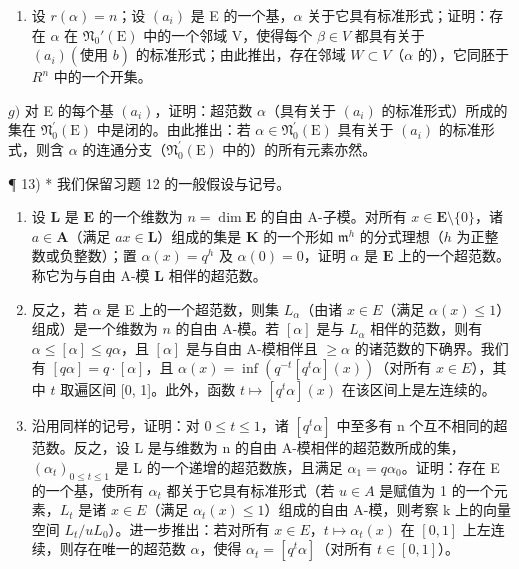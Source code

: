 \begin{enumerate}
\def\labelenumi{\alph{enumi})}
\setcounter{enumi}{5}
\tightlist
\item
  设 \(r(\alpha) = n\)；设 \((a_i)\) 是 E 的一个基，\(\alpha\) 关于它具有标准形式；证明：存在 \(\alpha\) 在 \(\mathfrak{N}_0'(\mathrm{E})\) 中的一个邻域 V，使得每个 \(\beta \in V\) 都具有关于 \((a_i)(\text{使用 } b)\) 的标准形式；由此推出，存在邻域 \(W \subset V\)（\(\alpha\) 的），它同胚于 \(R^n\) 中的一个开集。
\end{enumerate}

\(g)\) 对 E 的每个基 \((a_i)\)，证明：超范数 \(\alpha\)（具有关于 \((a_i)\) 的标准形式）所成的集在 \(\mathfrak{N}_0^{\prime}(\mathrm{E})\) 中是闭的。由此推出：若 \(\alpha \in \mathfrak{N}_0^{\prime}(\mathrm{E})\) 具有关于 \((a_i)\) 的标准形式，则含 \(\alpha\) 的连通分支（\(\mathfrak{N}_0^{\prime}(\mathrm{E})\) 中的）的所有元素亦然。

¶ 13) * 我们保留习题 12 的一般假设与记号。

\begin{enumerate}
\def\labelenumi{\alph{enumi})}
\item
  设 \(\mathbf{L}\) 是 \(\mathbf{E}\) 的一个维数为 \(n = \dim \mathbf{E}\) 的自由 A-子模。对所有 \(x \in \mathbf{E} \setminus \{0\}\)，诸 \(a \in \mathbf{A}\)（满足 \(ax \in \mathbf{L}\)）组成的集是 \(\mathbf{K}\) 的一个形如 \(\mathfrak{m}^h\) 的分式理想（\(h\) 为正整数或负整数）；置 \(\alpha(x) = q^h\) 及 \(\alpha(0) = 0\)，证明 \(\alpha\) 是 \(\mathbf{E}\) 上的一个超范数。称它为与自由 A-模 \(\mathbf{L}\) 相伴的超范数。
\item
  反之，若 \(\alpha\) 是 E 上的一个超范数，则集 \(L_{\alpha}\)（由诸 \(x \in E\)（满足 \(\alpha(x) \leqslant 1\)）组成）是一个维数为 \(n\) 的自由 A-模。若 \([\alpha]\) 是与 \(L_{\alpha}\) 相伴的范数，则有 \(\alpha \leqslant [\alpha] \leqslant q\alpha\)，且 \([\alpha]\) 是与自由 A-模相伴且 \(\geqslant \alpha\) 的诸范数的下确界。我们有 \([q\alpha] = q \cdot [\alpha]\)，且 \(\alpha(x) = \inf(q^{-t}[q^t\alpha](x))\)（对所有 \(x \in E\)），其中 \(t\) 取遍区间 {[}0, 1{]}。此外，函数 \(t \mapsto [q^t\alpha](x)\) 在该区间上是左连续的。
\item
  沿用同样的记号，证明：对 \(0 \leqslant t \leqslant 1\)，诸 \([q^{t}\alpha]\) 中至多有 n 个互不相同的超范数。反之，设 L 是与维数为 n 的自由 A-模相伴的超范数所成的集，\((\alpha_{t})_{0 \leqslant t \leqslant 1}\) 是 L 的一个递增的超范数族，且满足 \(\alpha_{1} = q\alpha_{0}\)。证明：存在 E 的一个基，使所有 \(\alpha_{t}\) 都关于它具有标准形式（若 \(u \in A\) 是赋值为 1 的一个元素，\(L_{t}\) 是诸 \(x \in E\)（满足 \(\alpha_{t}(x) \leqslant 1\)）组成的自由 A-模，则考察 k 上的向量空间 \(L_{t}/uL_{0}\)）。进一步推出：若对所有 \(x \in E\)，\(t \mapsto \alpha_{t}(x)\) 在 \([0, 1]\) 上左连续，则存在唯一的超范数 \(\alpha\)，使得 \(\alpha_{t} = [q^{t}\alpha]\)（对所有 \(t \in [0, 1]\)）。
\end{enumerate}


